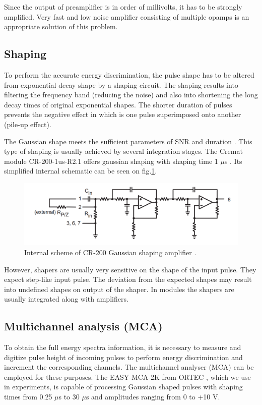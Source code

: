 \par

Since the output of preamplifier is in order of millivolts, it has to be strongly amplified. Very fast and low noise amplifier consisting of multiple opamps is an appropriate solution of this problem.



\subsection{Shaping}

To perform the accurate energy discrimination, the pulse shape has to be altered from exponential decay shape by a shaping circuit. The shaping results into filtering the frequency band (reducing the noise) and also into shortening the long decay times of original exponential shapes. The shorter duration of pulses prevents the negative effect in which is one pulse superimposed onto another (pile-up effect).

\par
The Gaussian shape meets the sufficient parameters of SNR and duration \cite{Shapflify}. This type of shaping is usually achieved by several integration stages. The Cremat module CR-200-1us-R2.1 offers gaussian shaping with shaping time 1 $\mu$s \cite{cr200}. Its simplified internal schematic can be seen on fig.\ref{internal2}. 


\begin{figure}[H]
 \centering
 \includegraphics[scale=0.35, angle = 0]{./pictures/CRshaper.png}
 \caption{Internal scheme of CR-200 Gaussian shaping amplifier \cite{cr200}.}
 \label{internal2}
 
\end{figure}

However, shapers are usually very sensitive on the shape of the input pulse. They expect step-like input pulse. The deviation from the expected shapes may result into undefined shapes on output of the shaper. In modules the shapers are usually integrated along with amplifiers.

\subsection{Multichannel analysis (MCA)}
To obtain the full energy spectra information, it is necessary to measure and digitize pulse height of incoming pulses to perform energy discrimination and increment the corresponding channels. The multichannel analyser (MCA) can be employed for these purposes. The EASY-MCA-2K from ORTEC \cite{MCAOrtec}, which we use in experiments, is capable of processing Gaussian shaped pulses with shaping times from 0.25 $\mu$s to 30 $\mu$s and amplitudes ranging from 0 to +10 V.




